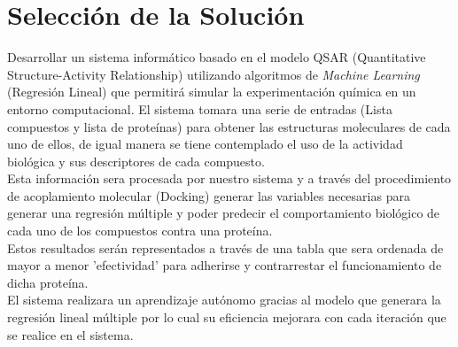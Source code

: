 \section{Selección de la Solución}{
\noindent Desarrollar un sistema informático basado en el modelo QSAR (Quantitative Structure-Activity Relationship) utilizando algoritmos de \textit{Machine Learning} (Regresión Lineal) que permitirá simular la experimentación química en un entorno computacional. El sistema tomara una serie de entradas (Lista compuestos y lista de proteínas) para obtener las estructuras moleculares de cada uno de ellos, de igual manera se tiene contemplado el uso de la actividad biológica y sus descriptores de cada compuesto.\\

\noindent Esta información sera procesada por nuestro sistema y a través del procedimiento de acoplamiento molecular (Docking) generar las variables necesarias para generar una regresión múltiple y poder predecir el comportamiento biológico de cada uno de los compuestos contra una proteína.\\

\noindent Estos resultados serán representados a través de una tabla que sera ordenada de mayor a menor 'efectividad' para adherirse y contrarrestar el funcionamiento de dicha proteína.\\
\noindent El sistema realizara un aprendizaje autónomo gracias al modelo que generara la regresión lineal múltiple por lo cual su eficiencia mejorara con cada iteración que se realice en el sistema. 
}
